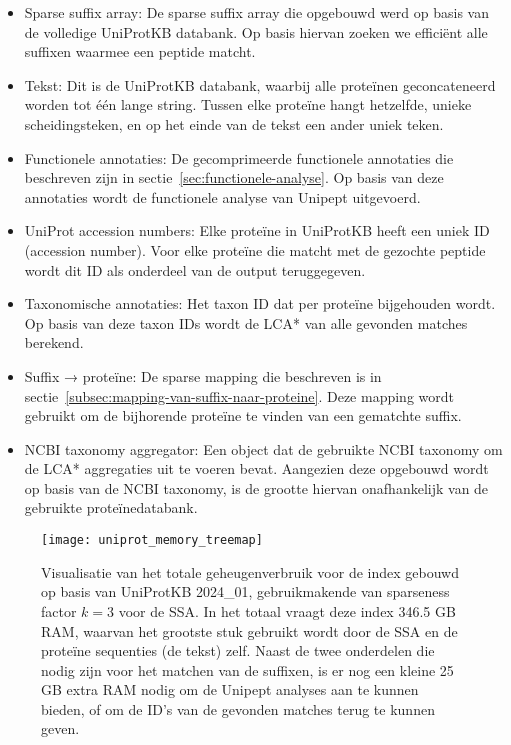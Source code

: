 \begin{itemize}
    \item Sparse suffix array: De sparse suffix array die opgebouwd werd op basis van de volledige UniProtKB databank.
    Op basis hiervan zoeken we efficiënt alle suffixen waarmee een peptide matcht.
    \item Tekst: Dit is de UniProtKB databank, waarbij alle proteïnen geconcateneerd worden tot één lange string.
    Tussen elke proteïne hangt hetzelfde, unieke scheidingsteken, en op het einde van de tekst een ander uniek teken.
    \item Functionele annotaties: De gecomprimeerde functionele annotaties die beschreven zijn in sectie~\ref{sec:functionele-analyse}.
    Op basis van deze annotaties wordt de functionele analyse van Unipept uitgevoerd.
    \item UniProt accession numbers: Elke proteïne in UniProtKB heeft een uniek ID (accession number).
    Voor elke proteïne die matcht met de gezochte peptide wordt dit ID als onderdeel van de output teruggegeven.
    \item Taxonomische annotaties: Het taxon ID dat per proteïne bijgehouden wordt.
    Op basis van deze taxon IDs wordt de LCA* van alle gevonden matches berekend.
    \item Suffix → proteïne: De sparse mapping die beschreven is in sectie~\ref{subsec:mapping-van-suffix-naar-proteine}.
    Deze mapping wordt gebruikt om de bijhorende proteïne te vinden van een gematchte suffix.
    \item NCBI taxonomy aggregator: Een object dat de gebruikte NCBI taxonomy om de LCA* aggregaties uit te voeren bevat.
    Aangezien deze opgebouwd wordt op basis van de NCBI taxonomy, is de grootte hiervan onafhankelijk van de gebruikte proteïnedatabank.
\end{itemize}

\begin{figure}[h]
    \centering
    \texttt{[image: uniprot\_memory\_treemap]}
    \caption{Visualisatie van het totale geheugenverbruik voor de index gebouwd op basis van UniProtKB 2024\_01, gebruikmakende van sparseness factor $k = 3$ voor de SSA.
    In het totaal vraagt deze index 346.5 GB RAM, waarvan het grootste stuk gebruikt wordt door de SSA en de proteïne sequenties (de tekst) zelf.
    Naast de twee onderdelen die nodig zijn voor het matchen van de suffixen, is er nog een kleine 25 GB extra RAM nodig om de Unipept analyses aan te kunnen bieden, of om de ID's van de gevonden matches terug te kunnen geven.}
    \label{fig:uniprot_memory_treemap}
\end{figure}

